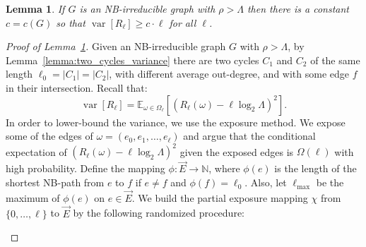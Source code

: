 \documentclass[10pt,a4paper]{amsart}
\newtheorem{lemma}{Lemma}
\newcommand{\E}{\mathbb{E}} %
\newcommand{\N}{\mathbb{N}} %
\newcommand{\dirE}{\vec{E}}
\DeclareMathOperator{\var}{var}
\begin{document}
\begin{lemma}\label{lemma:variance_lb}
    If $G$ is an NB-irreducible graph with $\rho > \Lambda$ then there is a constant $c=c(G)$ so that $\var[R_\ell] \geq c \cdot \ell$ for all $\ell$.
\end{lemma}

\begin{proof}[Proof of Lemma~\ref{lemma:variance_lb}]
    Given an NB-irreducible graph $G$ with $\rho > \Lambda$,
    by Lemma~\ref{lemma:two_cycles_variance} 
    there are two cycles $C_1$ and $C_2$ of the same length $\ell_0=|C_1| = |C_2|$, 
    with different average out-degree, and with some edge $f$ in their intersection.
    Recall that:
    \begin{equation*}
        \var[R_\ell] = \E_{\omega \in \Omega_\ell}\left[ {(R_\ell(\omega) - \ell \log_2\Lambda)}^2\right].
    \end{equation*}
    In order to lower-bound the variance, we use the exposure method. 
    We expose some of the edges of $\omega = (e_0,e_1,\ldots,e_\ell)$
    and argue that the conditional expectation of ${(R_\ell(\omega) - \ell \log_2\Lambda)}^2$ given the exposed edges is $\Omega(\ell)$ with high probability.
    Define the mapping $\phi:\dirE\to\N$, where $\phi(e)$ is the length of the shortest NB-path from $e$ to $f$ if $e \neq f$ and $\phi(f) = \ell_0$.
    Also, let $\ell_{\max}$ be the maximum of $\phi(e)$ on $e \in \dirE$.
    We build the partial exposure mapping $\chi$ from $\{0,\ldots,\ell\}$ to $\dirE$ by the following randomized procedure:
    
    \begin{center}
    \end{center}
    

\end{proof}
\end{document}
